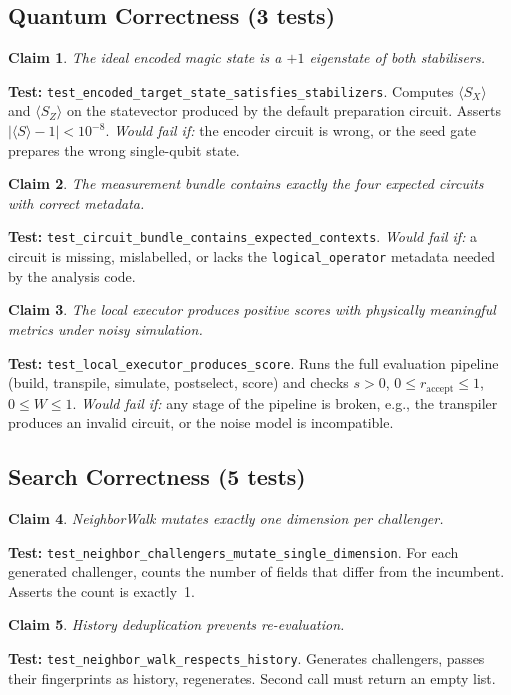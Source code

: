 \documentclass[11pt,a4paper]{article}
\newtheorem{claim}{Claim}[section]
\newcommand{\code}[1]{\texttt{#1}}
\newcommand{\expect}[1]{\langle #1 \rangle}
\begin{document}
\subsection{Quantum Correctness (3 tests)}

\begin{claim}
\label{claim:stabilizers}
The ideal encoded magic state is a $+1$ eigenstate of both stabilisers.
\end{claim}
\textbf{Test:} \code{test\_encoded\_target\_state\_satisfies\_stabilizers}.
Computes $\expect{S_X}$ and $\expect{S_Z}$ on the statevector produced by
the default preparation circuit. Asserts $|\expect{S} - 1| < 10^{-8}$.
\emph{Would fail if:} the encoder circuit is wrong, or the seed gate prepares
the wrong single-qubit state.

\begin{claim}
\label{claim:bundle}
The measurement bundle contains exactly the four expected circuits with
correct metadata.
\end{claim}
\textbf{Test:} \code{test\_circuit\_bundle\_contains\_expected\_contexts}.
\emph{Would fail if:} a circuit is missing, mislabelled, or lacks the
\code{logical\_operator} metadata needed by the analysis code.

\begin{claim}
\label{claim:executor}
The local executor produces positive scores with physically meaningful metrics
under noisy simulation.
\end{claim}
\textbf{Test:} \code{test\_local\_executor\_produces\_score}. Runs the full
evaluation pipeline (build, transpile, simulate, postselect, score) and checks
$s > 0$, $0 \leq r_{\text{accept}} \leq 1$, $0 \leq W \leq 1$.
\emph{Would fail if:} any stage of the pipeline is broken, e.g., the transpiler
produces an invalid circuit, or the noise model is incompatible.

\subsection{Search Correctness (5 tests)}

\begin{claim}
\label{claim:neighbor}
NeighborWalk mutates exactly one dimension per challenger.
\end{claim}
\textbf{Test:} \code{test\_neighbor\_challengers\_mutate\_single\_dimension}.
For each generated challenger, counts the number of fields that differ from
the incumbent. Asserts the count is exactly~1.

\begin{claim}
\label{claim:history}
History deduplication prevents re-evaluation.
\end{claim}
\textbf{Test:} \code{test\_neighbor\_walk\_respects\_history}. Generates
challengers, passes their fingerprints as history, regenerates. Second call
must return an empty list.
\end{document}
